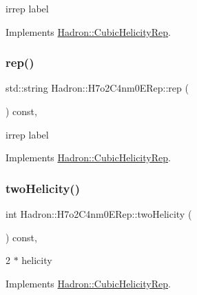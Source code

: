 irrep label 

Implements \mbox{\hyperlink{structHadron_1_1CubicHelicityRep_a8cdd86f068a167dc96faef02bfb8a33d}{Hadron\+::\+Cubic\+Helicity\+Rep}}.

\mbox{\label{structHadron_1_1H7o2C4nm0ERep_a60af54c0200a7bd60fc3f4346116cc34}} 
\subsubsection{\texorpdfstring{rep()}{rep()}\hspace{0.1cm}{\footnotesize\ttfamily [3/3]}}
{\footnotesize\ttfamily std\+::string Hadron\+::\+H7o2\+C4nm0\+E\+Rep\+::rep (\begin{DoxyParamCaption}{ }\end{DoxyParamCaption}) const\hspace{0.3cm}{\ttfamily [inline]}, {\ttfamily [virtual]}}

irrep label 

Implements \mbox{\hyperlink{structHadron_1_1CubicHelicityRep_a8cdd86f068a167dc96faef02bfb8a33d}{Hadron\+::\+Cubic\+Helicity\+Rep}}.

\mbox{\label{structHadron_1_1H7o2C4nm0ERep_aa823f506650bea0e0e2f79894f6f8360}} 
\subsubsection{\texorpdfstring{twoHelicity()}{twoHelicity()}\hspace{0.1cm}{\footnotesize\ttfamily [1/3]}}
{\footnotesize\ttfamily int Hadron\+::\+H7o2\+C4nm0\+E\+Rep\+::two\+Helicity (\begin{DoxyParamCaption}{ }\end{DoxyParamCaption}) const\hspace{0.3cm}{\ttfamily [inline]}, {\ttfamily [virtual]}}

2 $\ast$ helicity 

Implements \mbox{\hyperlink{structHadron_1_1CubicHelicityRep_af507aa56fc2747eacc8cb6c96db31ecc}{Hadron\+::\+Cubic\+Helicity\+Rep}}.

\mbox{\label{structHadron_1_1H7o2C4nm0ERep_aa823f506650bea0e0e2f79894f6f8360}} 

